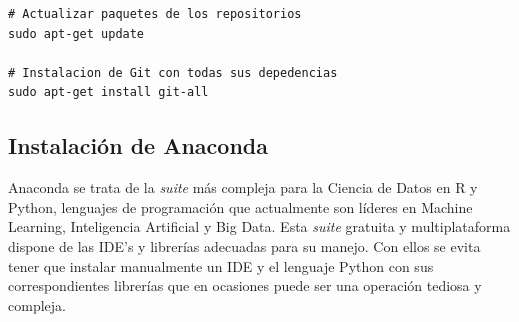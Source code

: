 \vspace{0.5cm}
\begin{lstlisting}[language=iPython,caption=Instalación de Git,captionpos=b,label={lst:install-git}]
# Actualizar paquetes de los repositorios
sudo apt-get update

# Instalacion de Git con todas sus depedencias
sudo apt-get install git-all
\end{lstlisting}

\subsection{Instalación de Anaconda}
\label{subsec:instalacion-anaconda}

Anaconda se trata de la \textit{suite} más compleja para la Ciencia de Datos en R y Python, lenguajes de programación que actualmente son líderes en Machine Learning, Inteligencia Artificial y Big Data. Esta \textit{suite} gratuita y multiplataforma dispone de las IDE's y librerías adecuadas para su manejo. Con ellos se evita tener que instalar manualmente un IDE y el lenguaje Python con sus correspondientes librerías que en ocasiones puede ser una operación tediosa y compleja.

